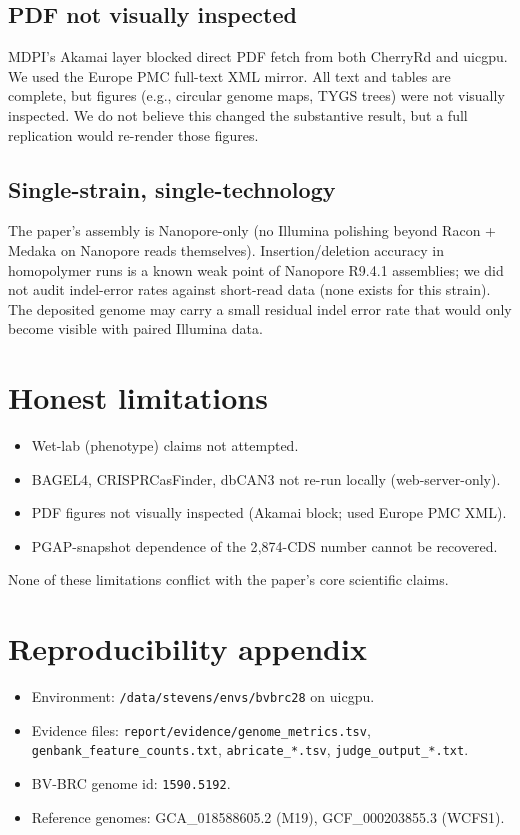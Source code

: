 \documentclass[11pt,a4paper]{article}
\begin{document}
\subsection{PDF not visually inspected}
MDPI's Akamai layer blocked direct PDF fetch from both CherryRd and uicgpu.
We used the Europe PMC full-text XML mirror. All text and tables are
complete, but figures (e.g., circular genome maps, TYGS trees) were not
visually inspected. We do not believe this changed the substantive result,
but a full replication would re-render those figures.

\subsection{Single-strain, single-technology}
The paper's assembly is Nanopore-only (no Illumina polishing beyond Racon +
Medaka on Nanopore reads themselves). Insertion/deletion accuracy in
homopolymer runs is a known weak point of Nanopore R9.4.1 assemblies; we did
not audit indel-error rates against short-read data (none exists for this
strain). The deposited genome may carry a small residual indel error rate
that would only become visible with paired Illumina data.

\section{Honest limitations}

\begin{itemize}[leftmargin=*]
\item Wet-lab (phenotype) claims not attempted.
\item BAGEL4, CRISPRCasFinder, dbCAN3 not re-run locally (web-server-only).
\item PDF figures not visually inspected (Akamai block; used Europe PMC XML).
\item PGAP-snapshot dependence of the 2{,}874-CDS number cannot be recovered.
\end{itemize}

None of these limitations conflict with the paper's core scientific claims.

\section{Reproducibility appendix}

\begin{itemize}[leftmargin=*]
\item Environment: \verb|/data/stevens/envs/bvbrc28| on uicgpu.
\item Evidence files: \texttt{report/evidence/genome\_metrics.tsv},
      \texttt{genbank\_feature\_counts.txt},
      \texttt{abricate\_*.tsv},
      \texttt{judge\_output\_*.txt}.
\item BV-BRC genome id: \texttt{1590.5192}.
\item Reference genomes: GCA\_018588605.2 (M19), GCF\_000203855.3 (WCFS1).
\end{itemize}
\end{document}
